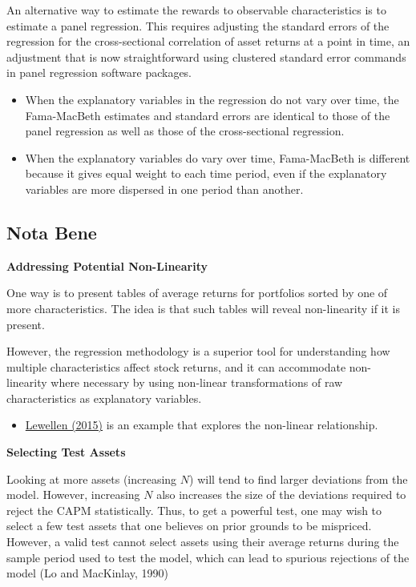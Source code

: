 \documentclass[
]{book}
\providecommand{\tightlist}{%
  \setlength{\itemsep}{0pt}\setlength{\parskip}{0pt}}
\begin{document}
An alternative way to estimate the rewards to observable characteristics is to estimate a panel regression. This requires adjusting the standard errors of the regression for the cross-sectional correlation of asset returns at a point in time, an adjustment that is now straightforward using clustered standard error commands in panel regression software packages.

\begin{itemize}
\tightlist
\item
  When the explanatory variables in the regression do not vary over time, the Fama-MacBeth estimates and standard errors are identical to those of the panel regression as well as those of the cross-sectional regression.
\item
  When the explanatory variables do vary over time, Fama-MacBeth is different because it gives equal weight to each time period, even if the explanatory variables are more dispersed in one period than another.
\end{itemize}

\hypertarget{nota-bene}{%
\subsection{Nota Bene}\label{nota-bene}}

\textbf{Addressing Potential Non-Linearity}

One way is to present tables of average returns for portfolios sorted by one of more characteristics. The idea is that such tables will reveal non-linearity if it is present.

However, the regression methodology is a superior tool for understanding how multiple characteristics affect stock returns, and it can accommodate non-linearity where necessary by using non-linear transformations of raw characteristics as explanatory variables.

\begin{itemize}
\tightlist
\item
  \href{https://papers.ssrn.com/sol3/papers.cfm?abstract_id=2511246}{Lewellen (2015)} is an example that explores the non-linear relationship.
\end{itemize}

\textbf{Selecting Test Assets}

Looking at more assets (increasing \(N\)) will tend to find larger deviations from the model. However, increasing \(N\) also increases the size of the deviations required to reject the CAPM statistically. Thus, to get a powerful test, one may wish to select a few test assets that one believes on prior grounds to be mispriced. However, a valid test cannot select assets using their average returns during the sample period used to test the model, which can lead to spurious rejections of the model (Lo and MacKinlay, 1990)
\end{document}
